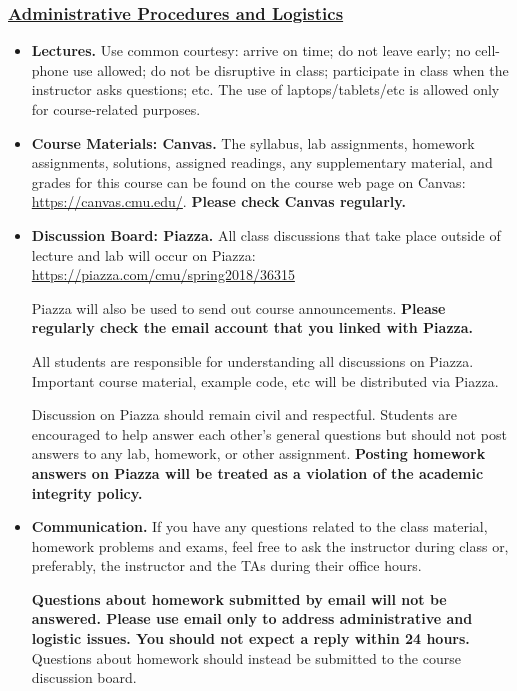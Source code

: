 \documentclass[11pt]{article}
\begin{document}
\subsubsection*{\underline{Administrative Procedures and Logistics}}
\begin{itemize}
\item {\bf Lectures.} Use common courtesy: arrive on time; do not leave early; no cell-phone use allowed; do not be disruptive in class; participate in class when the instructor asks questions; etc.  The  use of laptops/tablets/etc is allowed only for course-related purposes.
    
\item {\bf Course Materials:  Canvas.} The syllabus, lab assignments, homework assignments, solutions, assigned readings, any supplementary material, and grades for this course can be found on the course web page on Canvas:  \url{https://canvas.cmu.edu/}.  {\bf Please check Canvas regularly.}

\item {\bf Discussion Board:  Piazza.} All class discussions that take place outside of lecture and lab will occur on Piazza:  \url{https://piazza.com/cmu/spring2018/36315}

Piazza will also be used to send out course announcements. {\bf Please regularly check the email account that you linked with Piazza.}

All students are responsible for understanding all discussions on Piazza.  Important course material, example code, etc will be distributed via Piazza.

Discussion on Piazza should remain civil and respectful. Students are encouraged to help answer each other's general questions but should not post answers to any lab, homework, or other assignment. {\bf Posting homework answers on Piazza will be treated as a violation of the academic integrity policy.}

\item {\bf Communication.} If you have any questions related to the class material, homework problems and exams, feel free to ask the instructor during class or, preferably, the instructor and the TAs during their office hours. 

{\bf Questions about homework submitted by email will not be answered. Please use email only to address administrative and logistic issues. You should not expect a reply within 24 hours.}  Questions about homework should instead be submitted to the course discussion board.



\end{itemize}
\end{document}
